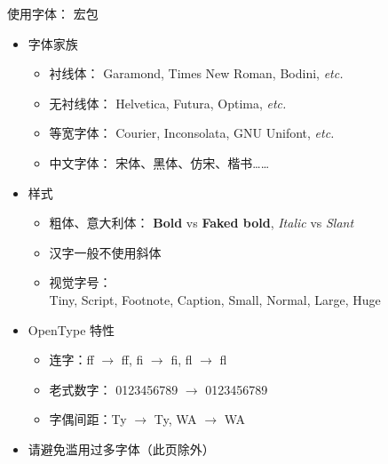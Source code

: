 \begin{frame}{使用字体： 宏包}
\begin{itemize}
  \item<1-> 字体家族 

    \begin{itemize}
      \item 衬线体：
        {\Garamond Garamond}, {\Times Times New Roman}, {\Bodini Bodini}, \textit{etc.}
      \item 无衬线体：
        {\Helvetica Helvetica}, {\Futura Futura}, {\Optima Optima}, \textit{etc.}
      \item 等宽字体：
        {\Courier Courier}, {\Inconsolata Inconsolata}, {\Unifont GNU Unifont}, \textit{etc.}
      \item 中文字体：
        宋体、{\heiti 黑体}、{\fangsong 仿宋}、{\kaishu 楷书}……
    \end{itemize}

  \item<2-> 样式 

    \begin{itemize}
      \item 粗体、意大利体：
        \textbf{Bold} vs {\textbf{Faked bold}},
        \textit{Italic} vs {\textsl{Slant}}
      \item<3-> \alert{汉字一般不使用斜体}
      \item<4-> 视觉字号：\\
        {\LatinRomanV    Tiny},
        {\LatinRomanVI   Script},
        {\LatinRomanVII  Footnote},
        {\LatinRomanVIII Caption},
        {\LatinRomanIX   Small},
        {\LatinRomanX    Normal},
        {\LatinRomanXII  Large},
        {\LatinRomanXVII Huge}
    \end{itemize}

  \item<5-> OpenType 特性

    \begin{itemize}
      \item 连字：f{}f $\to$ ff, f{}i $\to$ fi, f{}l $\to$ fl
      \item 老式数字：
        0123456789 $\to$ {0123456789}
      \item 字偶间距：T{}y $\to$ Ty, W{}A $\to$ WA
    \end{itemize}

  \item<6-> \alert{请避免滥用过多字体{\tiny （此页除外）}}
\end{itemize}
\vspace{-0.2cm}
\end{frame}
